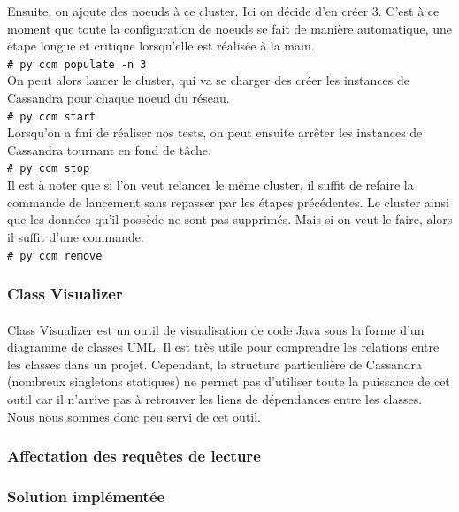 \documentclass[12pt]{article}
\newcommand{\shellcmd}[1]{\\\indent\indent\texttt{\footnotesize\# #1}\\}
\begin{document}
Ensuite, on ajoute des noeuds à ce cluster. Ici on décide d'en créer 3. C'est à ce moment que toute la configuration de noeuds se fait de manière automatique, une étape longue et critique lorsqu'elle est réalisée à la main.
\shellcmd{py ccm populate -n 3}

On peut alors lancer le cluster, qui va se charger des créer les instances de Cassandra pour chaque noeud du réseau.
\shellcmd{py ccm start}

Lorsqu'on a fini de réaliser nos tests, on peut ensuite arrêter les instances de Cassandra tournant en fond de tâche.
\shellcmd{py ccm stop}

Il est à noter que si l'on veut relancer le même cluster, il suffit de refaire la commande de lancement sans repasser par les étapes précédentes. Le cluster ainsi que les données qu'il possède ne sont pas supprimés. Mais si on veut le faire, alors il suffit d'une commande.
\shellcmd{py ccm remove}

\subsubsection*{Class Visualizer}

\paragraph{}Class Visualizer est un outil de visualisation de code Java sous la forme d'un diagramme de classes UML. Il est très utile pour comprendre les relations entre les classes dans un projet. Cependant, la structure particulière de Cassandra (nombreux singletons statiques) ne permet pas d'utiliser toute la puissance de cet outil car il n'arrive pas à retrouver les liens de dépendances entre les classes. Nous nous sommes donc peu servi de cet outil.

\subsubsection{Affectation des requêtes de lecture}

\subsubsection*{Solution implémentée}
\end{document}

